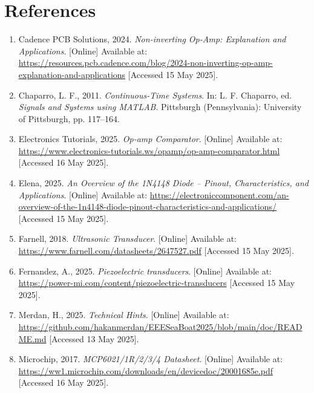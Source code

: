 \documentclass[12pt,a4paper]{report}
\begin{document}
\appendix
\chapter{References}
\begin{enumerate}
    \item Cadence PCB Solutions, 2024. \textit{Non-inverting Op-Amp: Explanation and Applications}. [Online]
          Available at: \url{https://resources.pcb.cadence.com/blog/2024-non-inverting-op-amp-explanation-and-applications}
          [Accessed 15 May 2025].

    \item Chaparro, L. F., 2011. \textit{Continuous-Time Systems}. In: L. F. Chaparro, ed. \textit{Signals and Systems using MATLAB}. Pittsburgh (Pennsylvania): University of Pittsburgh, pp. 117--164.

    \item Electronics Tutorials, 2025. \textit{Op-amp Comparator}. [Online]
          Available at: \url{https://www.electronics-tutorials.ws/opamp/op-amp-comparator.html}
          [Accessed 16 May 2025].

    \item Elena, 2025. \textit{An Overview of the 1N4148 Diode – Pinout, Characteristics, and Applications}. [Online]
          Available at: \url{https://electroniccomponent.com/an-overview-of-the-1n4148-diode-pinout-characteristics-and-applications/}
          [Accessed 15 May 2025].

    \item Farnell, 2018. \textit{Ultrasonic Transducer}. [Online]
          Available at: \url{https://www.farnell.com/datasheets/2647527.pdf}
          [Accessed 15 May 2025].

    \item Fernandez, A., 2025. \textit{Piezoelectric transducers}. [Online]
          Available at: \url{https://power-mi.com/content/piezoelectric-transducers}
          [Accessed 15 May 2025].

    \item Merdan, H., 2025. \textit{Technical Hints}. [Online]
          Available at: \url{https://github.com/hakanmerdan/EEESeaBoat2025/blob/main/doc/README.md}
          [Accessed 13 May 2025].

    \item Microchip, 2017. \textit{MCP6021/1R/2/3/4 Datasheet}. [Online]
          Available at: \url{https://ww1.microchip.com/downloads/en/devicedoc/20001685e.pdf}
          [Accessed 16 May 2025].


\end{enumerate}
\end{document}
